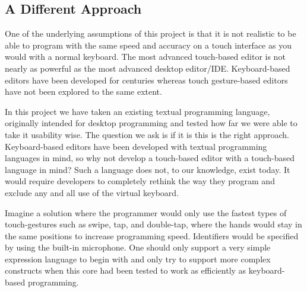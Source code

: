 \subsection{A Different Approach}
One of the underlying assumptions of this project is that it is not realistic to be able to program with the same speed and accuracy on a touch interface as you would with a normal keyboard. The most advanced touch-based editor is not nearly as powerful as the most advanced desktop editor/IDE. Keyboard-based editors have been developed for centuries whereas touch gesture-based editors have not been explored to the same extent. 

In this project we have taken an existing textual programming language, originally intended for desktop programming and tested how far we were able to take it usability wise. The question we ask is if it is this is the right approach. Keyboard-based editors have been developed with textual programming languages in mind, so why not develop a touch-based editor with a touch-based language in mind? Such a language does not, to our knowledge, exist today. It would require developers to completely rethink the way they program and exclude any and all use of the virtual keyboard.

Imagine a solution where the programmer would only use the fastest types of touch-gestures such as swipe, tap, and double-tap, where the hands would stay in the same positions to increase programming speed. Identifiers would be specified by using the built-in microphone. One should only support a very simple expression language to begin with and only try to support more complex constructs when this core had been tested to work as efficiently as keyboard-based programming.

